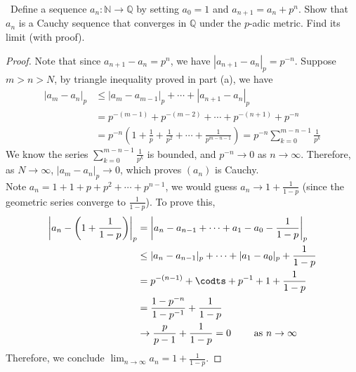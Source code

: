 \documentclass[12pt,a4paper]{amsart}
\newcommand{\bbN}{\mathbb{N}}
\newcommand{\bbQ}{\mathbb{Q}}
\newcommand{\turnin}{\faPencilSquareO}
\begin{document}
\begin{compactenum}[(a)]
\item \turnin\ Define a sequence $a_n\colon \bbN \to \bbQ$ by setting $a_0 = 1$ and $a_{n+1} = a_n + p^n$.
  Show that $a_n$ is a Cauchy sequence that converges in $\bbQ$ under the $p$-adic metric.
  Find its limit (with proof).

  \begin{proof}
    Note that since $a_{n+1} - a_n = p^n$, we have $|a_{n+1} - a_n|_p = p^{-n}$.
    Suppose $m>n>N$, by triangle inequality proved in part (a), we have
    \begin{align*}
      |a_m - a_n|_p &\le |a_m - a_{m-1}|_p + \cdots + |a_{n+1} - a_n|_p \\
                    &= p^{-(m-1)} + p^{-(m-2)} + \cdots + p^{-(n+1)} + p^{-n} \\
                    &= p^{-n} \left(1+ \frac{1}{p} + \frac{1}{p^2} + \cdots + \frac{1}{p^{m-n-1}}\right)
                     = p^{-n} \sum_{k=0}^{m-n-1} \frac{1}{p^k}
    \end{align*}
    We know the series $\sum_{k=0}^{m-n-1} \frac{1}{p^k}$ is bounded, and $p^{-n}\to 0$ as $n\to \infty$.
    Therefore, as $N\to\infty$, $|a_m - a_n|_p \to 0$, which proves $(a_n)$ is Cauchy. \\
    Note $a_n = 1+1+p+p^2+\cdots+p^{n-1}$, we would guess $a_n\to 1+\frac{1}{1-p}$
    (since the geometric series converge to $\frac{1}{1-p}$). To prove this,
    \begin{align*}
      \left\rvert a_n - \left(1 + \frac{1}{1-p}\right) \right\rvert_p &=
          \left\rvert a_{n} - a_{n-1} + \cdots + a_1-a_0 - \frac{1}{1-p}\right\rvert_p \\
          &\le |a_{n} - a_{n-1}|_p + \cdots + |a_1-a_0|_p + \frac{1}{1-p} \\
          &= p^{-(n-1)}+\codts + p^{-1} + 1 +  \frac{1}{1-p} \\
          &= \frac{1-p^{-n}}{1-p^{-1}} + \frac{1}{1-p} \\
          &\to \frac{p}{p-1} + \frac{1}{1-p} = 0 \qquad\textrm{ as } n\to\infty
    \end{align*}
    Therefore, we conclude $\lim_{n\to\infty} a_n = 1+\frac{1}{1-p}$.
  \end{proof}
\end{compactenum}
\end{document}
